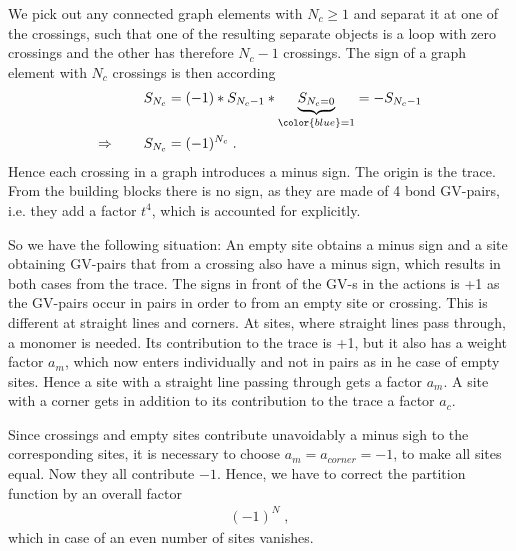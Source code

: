We pick out any connected graph  elements with $N_{c}\ge 1$ and separat it at  one of the crossings, such that one of the  resulting separate objects is a loop with zero crossings and the other has therefore $N_{c}-1$ crossings. The sign of a graph element with $N_{c}$ crossings is then according 
%
\begin{align*}
S_{N_{c}} &= (-1) * S_{N_{c}-1} * \underbrace{
S_{N_{c}=0}
}_{\color{blue} = 1} = -S_{N_{c}-1}\\
\Rightarrow\qquad S_{N_{c}} &= (-1)^{N_{c}}\;.
\end{align*}
%
Hence each crossing in a graph introduces a minus sign. The origin is the trace. From the
building blocks there is no sign, as they are made of 4 bond GV-pairs, i.e.
they add a factor $t^{4}$, which is accounted for explicitly.

So we have the following situation: An empty site obtains a minus sign and  a site obtaining GV-pairs that from a crossing also have a minus sign, which results in both cases from the trace. The signs in front of the GV-s in the actions is +1 as the GV-pairs occur in pairs
in order to from an empty site or crossing.
This is different at straight lines and corners. At sites, where straight lines pass through,
a monomer is needed. Its contribution to the trace is +1, but it also has a weight factor
$a_{m}$, which now enters individually and not in pairs as in he case of empty sites. Hence
a site with a straight line passing through  gets a factor $a_{m}$. A site with a corner gets in addition to its contribution to the trace a factor $a_{c}$.

Since crossings and empty sites contribute unavoidably a minus sigh to the
corresponding sites, it is necessary to choose $a_{m}=a_{corner}=-1$, to make all sites equal.
Now they all contribute $-1$. Hence, we have to correct the partition function by an overall
factor 
%
\begin{align*}
(-1)^{N}\;,
\end{align*}
%
which in case of an even number of sites vanishes.



